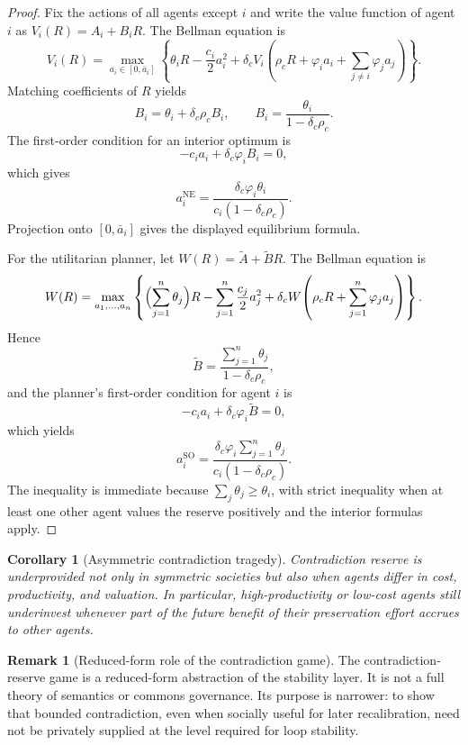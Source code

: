 \documentclass[11pt]{article}
\newtheorem{corollary}[theorem]{Corollary}
\theoremstyle{definition}
\newtheorem{remark}[theorem]{Remark}
\newcommand{\1}{\mathbf{1}}
\begin{document}
\begin{proof}
Fix the actions of all agents except $i$ and write the value function of agent $i$ as $V_i(R)=A_i+B_iR$. The Bellman equation is
\[
V_i(R)=\max_{a_i\in[0,\bar a_i]}\left\{\theta_i R-\frac{c_i}{2}a_i^2+\delta_c V_i\!\left(\rho_c R+\varphi_i a_i+\sum_{j\neq i}\varphi_j a_j\right)\right\}.
\]
Matching coefficients of $R$ yields
\[
B_i=\theta_i+\delta_c\rho_c B_i,
\qquad
B_i=\frac{\theta_i}{1-\delta_c\rho_c}.
\]
The first-order condition for an interior optimum is
\[
-c_i a_i+\delta_c \varphi_i B_i=0,
\]
which gives
\[
a_i^{\mathrm{NE}}=\frac{\delta_c\varphi_i\theta_i}{c_i(1-\delta_c\rho_c)}.
\]
Projection onto $[0,\bar a_i]$ gives the displayed equilibrium formula.

For the utilitarian planner, let $W(R)=\widetilde A+\widetilde B R$. The Bellman equation is
\[
W(R)=\max_{a_1,\dots,a_n}\left\{\Bigl(\sum_{j=1}^n\theta_j\Bigr)R-\sum_{j=1}^n\frac{c_j}{2}a_j^2+\delta_c W\!\left(\rho_c R+\sum_{j=1}^n\varphi_j a_j\right)\right\}.
\]
Hence
\[
\widetilde B=\frac{\sum_{j=1}^n\theta_j}{1-\delta_c\rho_c},
\]
and the planner's first-order condition for agent $i$ is
\[
-c_i a_i+\delta_c\varphi_i\widetilde B=0,
\]
which yields
\[
a_i^{\mathrm{SO}}=\frac{\delta_c\varphi_i\sum_{j=1}^n\theta_j}{c_i(1-\delta_c\rho_c)}.
\]
The inequality is immediate because $\sum_j\theta_j\ge \theta_i$, with strict inequality when at least one other agent values the reserve positively and the interior formulas apply.
\end{proof}

\begin{corollary}[Asymmetric contradiction tragedy]\label{cor:asym_contradiction}
Contradiction reserve is underprovided not only in symmetric societies but also when agents differ in cost, productivity, and valuation. In particular, high-productivity or low-cost agents still underinvest whenever part of the future benefit of their preservation effort accrues to other agents.
\end{corollary}

\begin{remark}[Reduced-form role of the contradiction game]
The contradiction-reserve game is a reduced-form abstraction of the stability layer. It is not a full theory of semantics or commons governance. Its purpose is narrower: to show that bounded contradiction, even when socially useful for later recalibration, need not be privately supplied at the level required for loop stability.
\end{remark}
\end{document}
